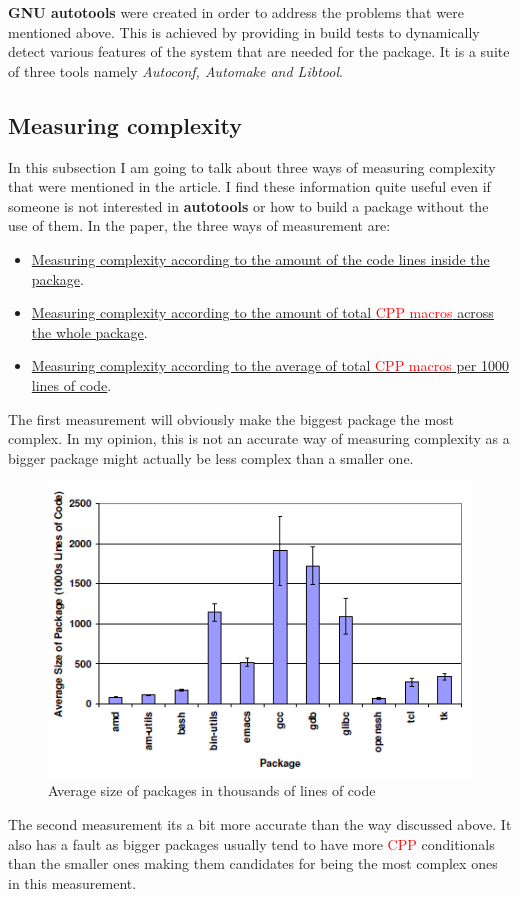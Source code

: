 \documentclass[11pt]{article}
\begin{document}
\textbf{GNU autotools} were created in order to address the problems that were mentioned above. This is achieved by providing in build tests to dynamically detect various features of the system that are needed for the package. It is a suite of three tools namely \textit{Autoconf, Automake and Libtool}.

\subsection{Measuring complexity}
In this subsection I am going to talk about three ways of measuring complexity that were mentioned in the article. I find these information quite useful even if someone is not interested in \textbf{autotools} or how to build a package without the use of them. In the paper, the three ways of measurement are:
\begin{itemize}
\item \underline{Measuring complexity according to the amount of the code lines inside the package}.
\item \underline{Measuring complexity according to the amount of total \textcolor{red}{CPP macros} across the whole package}.
\item \underline{Measuring complexity according to the average of total \textcolor{red}{CPP macros} per 1000 lines of code}.
\end{itemize}

The first measurement will obviously make the biggest package the most complex. In my opinion, this is not an accurate way of measuring complexity as a bigger package might actually be less complex than a smaller one.

\begin{figure}[!htb]
\centering
  \includegraphics[width=.7\textwidth,natwidth=610,natheight=642]{images/measure1.png}
  \caption{Average size of packages in thousands of lines of
code \cite{zadok2002}}
  \label{fig:measure1}
\end{figure}
\FloatBarrier
The second measurement its a bit more accurate than the way discussed above. It also has a fault as bigger packages usually tend to have more \textcolor{red}{CPP} conditionals than the smaller ones making them candidates for being the most complex ones in this measurement.
\end{document}
